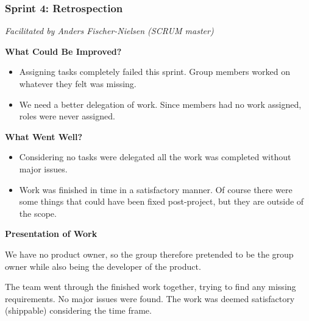 \subsubsection{Sprint 4: Retrospection}
\small{\textit{Facilitated by Anders Fischer-Nielsen (SCRUM master)}} 

\textbf{What Could Be Improved?}

\begin{itemize}
	\item Assigning tasks completely failed this sprint. Group members worked on whatever they felt was missing.
	\item We need a better delegation of work. Since members had no work assigned, roles were never assigned.
\end{itemize}

\textbf{What Went Well?}

\begin{itemize}
	\item Considering no tasks were delegated all the work was completed without major issues. 
	\item Work was finished in time in a satisfactory manner. Of course there were some things that could have been fixed post-project, but they are outside of the scope. 
\end{itemize}

\textbf{Presentation of Work}

We have no product owner, so the group therefore pretended to be the group owner while also being the developer of the product.

The team went through the finished work together, trying to find any missing requirements. 
No major issues were found. The work was deemed satisfactory (shippable) considering the time frame.
